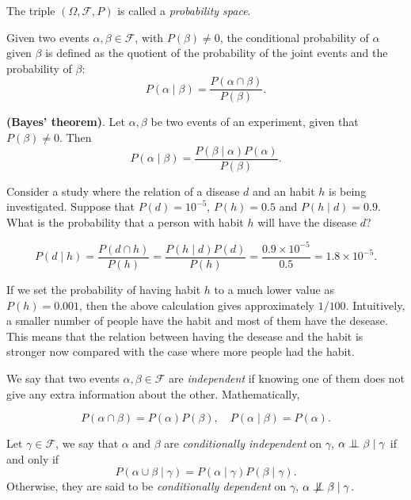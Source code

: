 The triple \((\Omega, \mathcal{F}, P)\) is called a \emph{probability space}.

\begin{definition}
  Given two events \(\alpha, \beta \in \mathcal{F}\), with \(P(\beta) \neq 0\),
  the conditional probability of \(\alpha\) given \(\beta\) is defined as the
  quotient of the probability of the joint events and the probability of
  \(\beta\):
  \[
    P(\alpha \mid \beta) = \frac{P(\alpha \cap \beta)}{P(\beta)}.
  \]
\end{definition}



\begin{theorem}
  \textbf{(Bayes' theorem)}. Let \(\alpha, \beta\) be two events of an
  experiment, given that \(P(\beta) \neq 0\). Then
  \[
  P(\alpha \mid \beta)= \frac{P(\beta \mid \alpha)P(\alpha)}{P(\beta)}.
\]
\end{theorem}



\begin{exampleth}
Consider a study where the relation of a disease \(d\) and an habit \(h\)
is being investigated. Suppose that \(P(d)=10^{-5}\), \(P(h)=0.5\) and \(P(h\mid d) = 0.9\). What is the
probability that a person with habit \(h\) will have the disease \(d\)?

\[
P(d \mid h) = \frac{P(d \cap h)}{P(h)} = \frac{P(h \mid d)P(d)}{P(h)} =
\frac{ 0.9 \times 10^{-5}}{ 0.5 } = 1.8 \times 10^{-5}.
\]

If we set the probability of having habit \(h\) to a much lower value as \(P(h) =
0.001\), then the above calculation gives approximately \(1/100\). Intuitively, a smaller number of people have the habit and most of them have the
desease. This means that the relation between having the desease and the habit
is stronger now compared with the case where more people had the habit.
\end{exampleth}

\begin{definition}
  We say that two events \(\alpha, \beta \in \mathcal{F}\) are
  \emph{independent} if knowing one of them does not give any extra information
  about the other. Mathematically,

  \[
    P(\alpha \cap \beta) = P(\alpha)P(\beta), \quad P(\alpha \mid \beta) = P(\alpha).
  \]

  Let \(\gamma \in \mathcal{F}\), we say that \(\alpha\) and \(\beta\) are
  \emph{conditionally independent} on \(\gamma\), \(\alpha \bigCI \beta \mid \gamma\)
  if and only if
  \[
    P(\alpha \cup \beta \mid \gamma) = P(\alpha \mid \gamma)P(\beta \mid \gamma).
  \]
  Otherwise, they are said to be \emph{conditionally dependent} on \(\gamma\),  \(\alpha \bigCD \beta \mid \gamma\).

\end{definition}

